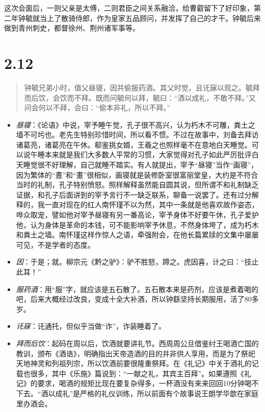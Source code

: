 \documentclass[]{book}
\providecommand{\tightlist}{%
  \setlength{\itemsep}{0pt}\setlength{\parskip}{0pt}}
\begin{document}
这次会面后，一则父亲是太傅，二则君臣之间关系融洽，给曹叡留下了好印象，第二年钟毓就当上了散骑侍郎，作为皇家五品顾问，并发挥了自己的才干。钟毓后来做到青州刺史，都督徐州、荆州诸军事等。

\section{2.12}\label{section-58}

\begin{quote}
钟毓兄弟小时，值父昼寝，因共偷服药酒。其父时觉，且讬寐以观之。毓拜而后饮，会饮而不拜。既而问毓何以拜，毓曰：``酒以成礼，不敢不拜。''又问会何以不拜，会曰：``偷本非礼，所以不拜。''
\end{quote}

\begin{itemize}
\tightlist
\item
  \emph{昼寝}：《论语》中说，宰予睡午觉，孔子很不高兴，认为朽木不可雕，粪土之墙不可圬也。老先生特别珍惜时间，所以看不惯。不过在故事中，刘备去拜访诸葛亮，诸葛亮在午休。郗鉴挑女婿，王羲之也照样毫不在意地白天睡觉。可以说午睡本来就是我们大多数人平常的习惯，大家觉得对孔子如此严厉批评白天睡觉很不好理解，自己就睡不踏实。有人就提出，宰予``昼寝''当作``画寝''，因为繁体的``晝''和``畫''很相似，画寝就是装修卧室很富丽堂皇，大约是不符合当时的礼制，孔子特别愤怒。照样解释虽然能自圆其说，但所谓不和礼制缺乏证据，和孔子后面讲到的宰予言行不一缺乏联系，聊备一说罢了。还有过分解释的，我一直对现在的红人南怀瑾不以为然，其中一条就是他喜欢故作姿态，哗众取宠，譬如他对宰予昼寝有另一番高论，宰予身体不好要午休，孔子爱护他，认为身体是革命的本钱，可不能影响宰予休息，不然身体垮了，成为朽木和粪土之墙。南怀瑾这样作惊人之语，牵强附会，在他长篇累牍的文集中屡屡可见，不是学者的态度。
\item
  \emph{因}：于是；就。柳宗元《黔之驴》：驴不胜怒，蹄之。虎因喜，计之曰：``技止此耳！''
\item
  \emph{服药酒}：用``服''字，就应该是五石散了。五石散本来是药剂，应该是煮着喝的吧，后来大概经过改良，变成十全大补酒，所以钟繇坚持长期服用，活了80多岁。
\item
  \emph{讬寐}：讬通托，但似乎当做``诈''，诈装睡着了。
\item
  \emph{拜而后饮}：起码在周以后，饮酒就要讲礼节。西周周公旦借鉴纣王喝酒亡国的教训，颁布《酒诰》，明确指出天帝造酒的目的并非供人享用，而是为了祭祀天地神灵和列祖列宗，所以饮酒前要很隆重祭拜。在《礼记》中关于酒礼的记载也很多，其中《乐施》篇说到：``一献之礼，其宾主百拜''。如果遵照《礼记》的要求，喝酒的规矩比现在要复杂得多，一杯酒没有来来回回10分钟喝不下去。``酒以成礼''是严格的礼仪训练，所以前面有个故事说王朗学华歆在家庭里办酒会。
\end{itemize}
\end{document}
